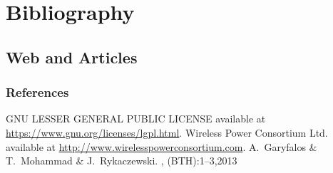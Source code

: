 \section{Bibliography}
\subsection*{Web and Articles}

\begin{frame}[allowframebreaks]
  \frametitle<presentation>{References}
     
  \begin{thebibliography}{10}
      GNU LESSER GENERAL PUBLIC LICENSE
      \newblock available at \url{https://www.gnu.org/licenses/lgpl.html}.
      Wireless Power Consortium Ltd.
      \newblock available at \url{http://www.wirelesspowerconsortium.com}.
      A.~Garyfalos \& T.~Mohammad \& J.~Rykaczewski.
      , (BTH):1--3,2013
  \end{thebibliography}
\end{frame}
